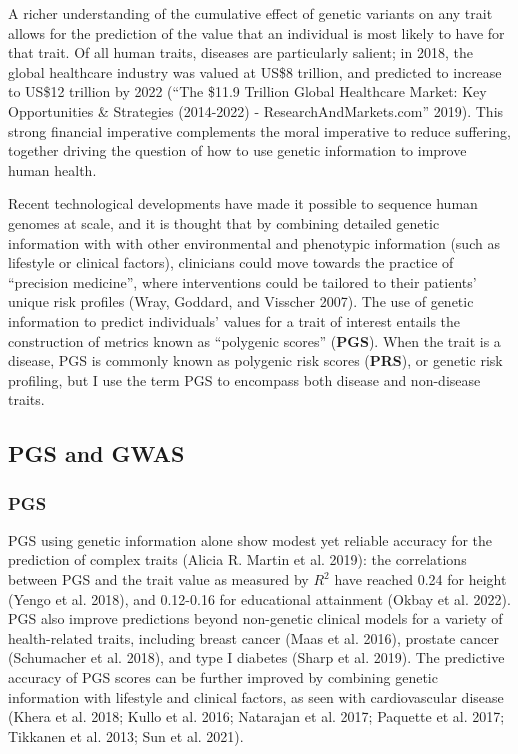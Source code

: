 \documentclass[
]{book}
\begin{document}
A richer understanding of the cumulative effect of genetic variants on any trait allows for the prediction of the value that an individual is most likely to have for that trait. Of all human traits, diseases are particularly salient; in 2018, the global healthcare industry was valued at US\$8 trillion, and predicted to increase to US\$12 trillion by 2022 ({``The \$11.9 {Trillion Global Healthcare Market}: {Key Opportunities} \& {Strategies} (2014-2022) - {ResearchAndMarkets}.com''} 2019). This strong financial imperative complements the moral imperative to reduce suffering, together driving the question of how to use genetic information to improve human health.

Recent technological developments have made it possible to sequence human genomes at scale, and it is thought that by combining detailed genetic information with with other environmental and phenotypic information (such as lifestyle or clinical factors), clinicians could move towards the practice of ``precision medicine'', where interventions could be tailored to their patients' unique risk profiles (Wray, Goddard, and Visscher 2007). The use of genetic information to predict individuals' values for a trait of interest entails the construction of metrics known as ``polygenic scores'' (\textbf{PGS}). When the trait is a disease, PGS is commonly known as polygenic risk scores (\textbf{PRS}), or genetic risk profiling, but I use the term PGS to encompass both disease and non-disease traits.

\hypertarget{pgs-and-gwas}{%
\subsection{PGS and GWAS}\label{pgs-and-gwas}}

\hypertarget{pgs}{%
\subsubsection{PGS}\label{pgs}}

PGS using genetic information alone show modest yet reliable accuracy for the prediction of complex traits (Alicia R. Martin et al. 2019): the correlations between PGS and the trait value as measured by \(R^2\) have reached 0.24 for height (Yengo et al. 2018), and 0.12-0.16 for educational attainment (Okbay et al. 2022). PGS also improve predictions beyond non-genetic clinical models for a variety of health-related traits, including breast cancer (Maas et al. 2016), prostate cancer (Schumacher et al. 2018), and type I diabetes (Sharp et al. 2019). The predictive accuracy of PGS scores can be further improved by combining genetic information with lifestyle and clinical factors, as seen with cardiovascular disease (Khera et al. 2018; Kullo et al. 2016; Natarajan et al. 2017; Paquette et al. 2017; Tikkanen et al. 2013; Sun et al. 2021).
\end{document}
